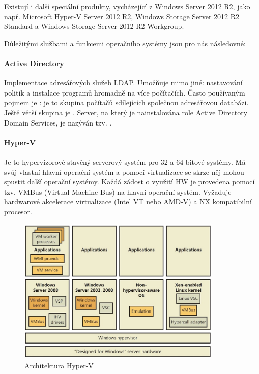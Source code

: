 Existují i další speciální produkty, vycházející z Windows Server 2012 R2, jako např. Microsoft Hyper-V Server 2012 R2, Windows Storage Server 2012 R2 Standard a Windows Storage Server 2012 R2 Workgroup.

Důležitými službami a funkcemi operačního systémy jsou pro nás následovné:

\paragraph{Active Directory}
Implementace adresářových služeb LDAP. Umožňuje mimo jiné: nastavování politik a instalace programů hromadně na více počítačích. Často používaným pojmem je : je to skupina počítačů sdílejících společnou adresářovou databázi. Ještě větší skupina je . Server, na který je nainstalována role Active Directory Domain Services, je nazýván tzv. . \cite{MasteringWindowsServer}

\paragraph{Hyper-V} 
Je to hypervizorově stavěný serverový systém pro 32 a 64 bitové systémy. Má svůj vlastní hlavní operační systém a pomocí virtualizace se skrze něj mohou spustit další operační systémy. Každá zádost o využití HW je provedena pomocí tzv. VMBus (Virtual Machine Bus) na hlavní operační systém. Vyžaduje hardwarové akcelerace virtualizace (Intel VT nebo AMD-V) a NX kompatibilní procesor. \cite{WindowsInternalsPart1}

\begin{figure}[]
  \centering
  \includegraphics[height=7cm]{fig/hyperv_architektura.jpg}
  \caption{Architektura Hyper-V \cite{WindowsInternalsPart1}}
  \label{fig:hypervarchitektura}
\end{figure}

